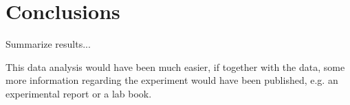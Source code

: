 \documentclass[aps,prx,reprint,amsmath,amssymb,superscriptaddress,showpacs]{revtex4-1}
\begin{document}
\section{Conclusions}

Summarize results...

This data analysis would have been much easier, if together with the data, some more information regarding the experiment would have been published, e.g. an experimental report or a lab book.



\end{document}
